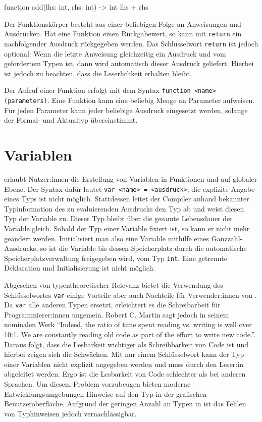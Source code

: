 \begin{ToyaCode}[numbers=none, caption={Eine typische Funktion unter toya.}, label=lst:intro_simplefunction]
function add(lhs: int, rhs: int) -> int {
    lhs + rhs
}
\end{ToyaCode}

Der Funktionskörper besteht aus einer beliebigen Folge an Anweisungen und Ausdrücken. Hat eine Funktion einen Rückgabewert, so kann mit \texttt{return} ein nachfolgender Ausdruck rückgegeben werden. Das Schlüsselwort \texttt{return} ist jedoch optional: Wenn die letzte Anweisung gleichzeitig ein Ausdruck und vom gefordertem Typen ist, dann wird automatisch dieser Ausdruck geliefert. Hierbei ist jedoch zu beachten, dass die Leserlichkeit erhalten bleibt.

Der Aufruf einer Funktion erfolgt mit dem Syntax \texttt{function <name>(parameters)}. Eine Funktion kann eine beliebig Menge an Parameter aufweisen. Für jeden Parameter kann jeder beliebige Ausdruck eingesetzt werden, solange der Formal- und Aktualtyp übereinstimmt.


\section{Variablen}
\Toya erlaubt Nutzer:innen die Erstellung von Variablen in Funktionen und auf globaler Ebene. Der Syntax dafür lautet \texttt{var <name> = <ausdruck>}; die explizite Angabe eines Typs ist nicht möglich. Stattdessen leitet der Compiler anhand bekannter Typinformation des zu evaluierenden Ausdrucks den Typ ab und weist diesen Typ der Variable zu. Dieser Typ bleibt über die gesamte Lebensdauer der Variable gleich. Sobald der Typ einer Variable fixiert ist, so kann er nicht mehr geändert werden. Initialisiert man also eine Variable mithilfe eines Ganzzahl-Ausdrucks, so ist die Variable bis dessen Speicherplatz durch die automatische Speicherplatzverwaltung freigegeben wird, vom Typ \texttt{int}. Eine getrennte Deklaration und Initialisierung ist nicht möglich.

Abgesehen von typentheoretischer Relevanz bietet die Verwendung des Schlüsselwortes \texttt{var} einige Vorteile aber auch Nachteile für Verwender:innen von \toya. Da \texttt{var} alle anderen Typen ersetzt, erleichtert es die Schreibarbeit für Programmierer:innen ungemein. Robert C. Martin sagt jedoch in seinem nominalen Werk \textcite{martin2009clean} ``Indeed, the ratio of time spent reading vs. writing is well over 10:1. We are constantly reading old code as part of the effort to write new code.''. Daraus folgt, dass die Lesbarkeit wichtiger als Schreibbarkeit von Code ist und hierbei zeigen sich die Schwächen. Mit nur einem Schlüsselwort kann der Typ einer Variablen nicht explizit angegeben werden und muss durch den Leser:in abgeleitet werden. Ergo ist die Lesbarkeit von \toya Code schlechter als bei anderen Sprachen. Um diesem Problem vorzubeugen bieten moderne Entwicklungsumgebungen Hinweise auf den Typ in der grafischen Benutzeroberfläche. Aufgrund der geringen Anzahl an Typen in \toya ist das Fehlen von Typhinweisen jedoch vernachlässigbar.

